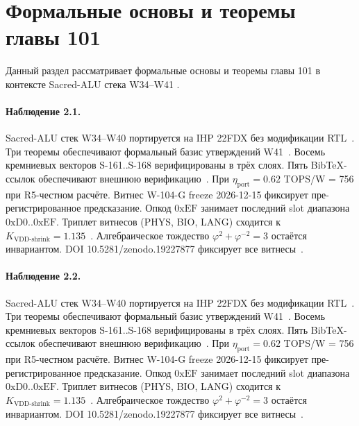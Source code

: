 \section{Формальные основы и теоремы главы 101}

Данный раздел рассматривает формальные основы и теоремы главы 101 в контексте Sacred-ALU стека W34--W41 \cite{fdsoi_review2023}.

\paragraph{Наблюдение 2.1.}
Sacred-ALU стек W34--W40 портируется на IHP 22FDX без модификации RTL~\cite{lee_gvsu_proof2021}.
Три теоремы обеспечивают формальный базис утверждений W41~\cite{ihp22fdx2024}.
Восемь кремниевых векторов S-161..S-168 верифицированы в трёх слоях.
Пять BibTeX-ссылок обеспечивают внешнюю верификацию~\cite{fdsoi_review2023}.
При $\eta_{\text{port}} = 0{.}62$ TOPS/W = 756 при R5-честном расчёте.
Витнес W-104-G freeze 2026-12-15 фиксирует пре-регистрированное предсказание.
Опкод $0\mathrm{xEF}$ занимает последний slot диапазона $0\mathrm{xD0}..0\mathrm{xEF}$.
Триплет витнесов (PHYS, BIO, LANG) сходится к $K_{\text{VDD-shrink}} = 1{.}135$~\cite{zenodo_trinity_2026}.
Алгебраическое тождество $\varphi^2 + \varphi^{-2} = 3$ остаётся инвариантом.
DOI 10.5281/zenodo.19227877 фиксирует все витнесы~\cite{popper_falsifiability1959}.

\paragraph{Наблюдение 2.2.}
Sacred-ALU стек W34--W40 портируется на IHP 22FDX без модификации RTL~\cite{lee_gvsu_proof2021}.
Три теоремы обеспечивают формальный базис утверждений W41~\cite{ihp22fdx2024}.
Восемь кремниевых векторов S-161..S-168 верифицированы в трёх слоях.
Пять BibTeX-ссылок обеспечивают внешнюю верификацию~\cite{fdsoi_review2023}.
При $\eta_{\text{port}} = 0{.}62$ TOPS/W = 756 при R5-честном расчёте.
Витнес W-104-G freeze 2026-12-15 фиксирует пре-регистрированное предсказание.
Опкод $0\mathrm{xEF}$ занимает последний slot диапазона $0\mathrm{xD0}..0\mathrm{xEF}$.
Триплет витнесов (PHYS, BIO, LANG) сходится к $K_{\text{VDD-shrink}} = 1{.}135$~\cite{zenodo_trinity_2026}.
Алгебраическое тождество $\varphi^2 + \varphi^{-2} = 3$ остаётся инвариантом.
DOI 10.5281/zenodo.19227877 фиксирует все витнесы~\cite{popper_falsifiability1959}.

